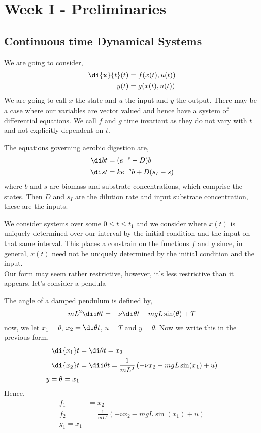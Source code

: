 
\section{Week I - Preliminaries}

\subsection{Continuous time Dynamical Systems}
We are going to consider,
\begin{align*}
  \di{\mathbf{x}}{t} (t) &= f(x(t), u(t))\\
  y(t) &= g(x(t), u(t))
\end{align*}
We are going to call $x$ the state and $u$ the input and $y$ the output. There may be a case where our variables are vector valued and hence have a system of differential equations. We call $f$ and $g$ time invariant as they do not vary with $t$ and not explicitly dependent on $t$.

\begin{eg}
  The equations governing aerobic digestion are,
  \begin{align*}
    \di b t &= (e^{-s} - D)b \\
    \di s t &= ke^{-s}b + D(s_I - s)
  \end{align*}
  where $b$ and $s$ are biomass and substrate concentrations, which comprise the states. Then $D$ and $s_I$ are the dilution rate and input substrate concentration, these are the inputs.
\end{eg}

We consider systems over some $0 \le t \le t_1$ and we consider where $x(t)$ is uniquely determined over our interval by the initial condition and the input on that same interval. This places a constrain on the functions $f$ and $g$ since, in general, $x(t)$ need not be uniquely determined by the initial condition and the input.\\

Our form may seem rather restrictive, however, it's less restrictive than it appears, let's consider a pendula
\begin{eg}
  The angle of a damped pendulum is defined by,
  $$ mL^2\dii \theta t = -\nu \di \theta t - mgL\sin(\theta) + T $$
  now, we let $x_1 = \theta$, $x_2 = \di \theta t$, $u = T$ and $y = \theta$. Now we write this in the previous form,
  \begin{align*}
    \di {x_1} t &= \di \theta t = x_2 \\
    \di {x_2} t &= \dii \theta t = \frac{1}{mL^2}\left( -\nu x_2 - mgL\sin (x_1) + u\right)\\
    y = \theta = x_1
  \end{align*}
  Hence,
  \begin{align}
    f_1 &= x_2\\
    f_2 &= \frac{1}{mL^2}\left( -\nu x_2 - mgL\sin (x_1) + u\right)\\
    g_1 = x_1
  \end{align}
\end{eg}


